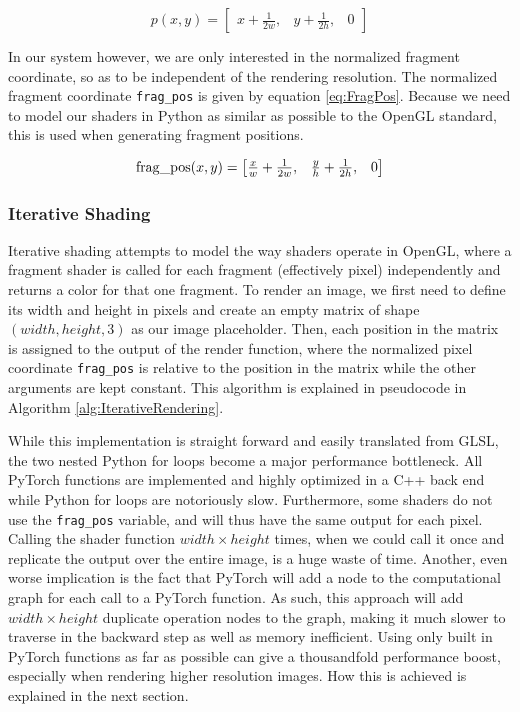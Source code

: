 \begin{equation}\label{eq:UnnormalizedFragPos}
p(x,y) = \begin{bmatrix}x + \frac{1}{2w}, & y + \frac{1}{2h}, & 0\end{bmatrix}
\end{equation}

In our system however, we are only interested in the normalized fragment coordinate, so as to be independent of the rendering resolution. The normalized fragment coordinate \texttt{frag\_pos} is given by equation \ref{eq:FragPos}. Because we need to model our shaders in Python as similar as possible to the OpenGL standard, this is used when generating fragment positions.

\begin{equation}\label{eq:FragPos}
    \operatorname{frag\_pos}(x,y) = \begin{bmatrix}\frac{x}{w} + \frac{1}{2w}, & \frac{y}{h} + \frac{1}{2h}, & 0\end{bmatrix}
\end{equation}


\subsubsection{Iterative Shading}\label{sec:MethodIterativeRendering}

Iterative shading attempts to model the way shaders operate in OpenGL, where a fragment shader is called for each fragment (effectively pixel) independently and returns a color for that one fragment. To render an image, we first need to define its width and height in pixels and create an empty matrix of shape $(width, height, 3)$ as our image placeholder. Then, each position in the matrix is assigned to the output of the render function, where the normalized pixel coordinate \texttt{frag\_pos} is relative to the position in the matrix while the other arguments are kept constant. This algorithm is explained in pseudocode in Algorithm \ref{alg:IterativeRendering}. 

While this implementation is straight forward and easily translated from GLSL, the two nested Python for loops become a major performance bottleneck. All PyTorch functions are implemented and highly optimized in a C++ back end while Python for loops are notoriously slow. Furthermore, some shaders do not use the \texttt{frag\_pos} variable, and will thus have the same output for each pixel. Calling the shader function $width \times height$ times, when we could call it once and replicate the output over the entire image, is a huge waste of time. Another, even worse implication is the fact that PyTorch will add a node to the computational graph for each call to a PyTorch function. As such, this approach will add $width \times height$ duplicate operation nodes to the graph, making it much slower to traverse in the backward step as well as memory inefficient. Using only built in PyTorch functions as far as possible can give a thousandfold performance boost, especially when rendering higher resolution images. How this is achieved is explained in the next section.

